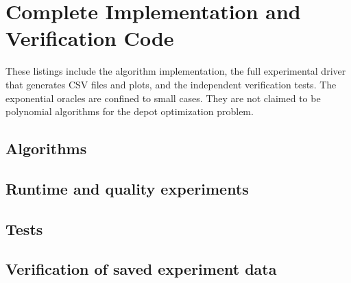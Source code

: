 \documentclass[sigconf,nonacm]{acmart}
\begin{document}
\section{Complete Implementation and Verification Code}\label{app:code}
These listings include the algorithm implementation, the full experimental
driver that generates CSV files and plots, and the independent verification
tests. The exponential oracles are confined to small cases. They are not
claimed to be polynomial algorithms for the depot optimization problem.
\subsection{Algorithms}

\subsection{Runtime and quality experiments}

\subsection{Tests}

\subsection{Verification of saved experiment data}

\end{document}
